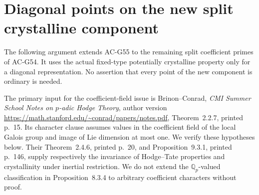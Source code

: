 \section{Diagonal points on the new split crystalline component}
\label{sec:cubic-fixed-point-split}

The following argument extends AC-G55 to the remaining
split coefficient primes of AC-G54.  It uses the
actual fixed-type potentially crystalline property
only for a diagonal representation.  No assertion
that every point of the new component is ordinary
is needed.

The primary input for the coefficient-field issue
is Brinon--Conrad, \emph{CMI Summer School Notes on
$p$-adic Hodge Theory}, author version
\url{https://math.stanford.edu/~conrad/papers/notes.pdf},
Theorem~2.2.7, printed p.~15.
Its character clause assumes values in the
coefficient field of the local Galois group and
image of Lie dimension at most one.
We verify these hypotheses below.
Their Theorem~2.4.6, printed p.~20, and
Proposition~9.3.1, printed p.~146, supply respectively
the invariance of Hodge--Tate properties and
crystallinity under inertial restriction.
We do not extend the $\mathbb Q_p$-valued
classification in Proposition~8.3.4 to arbitrary
coefficient characters without proof.


